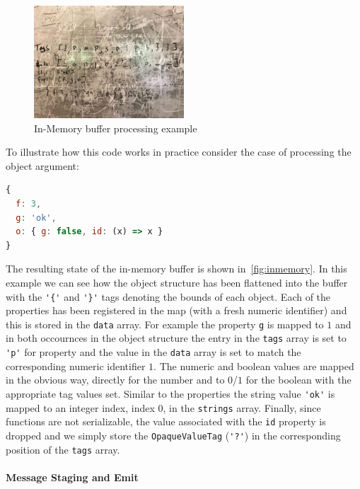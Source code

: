 \begin{figure}
    \centering
    \includegraphics[width=0.5\textwidth]{Figures/InMemoryExample}
    \caption{In-Memory buffer processing example}
    \label{fig:inmemory}
\end{figure}

To illustrate how this code works in practice consider the case of processing the 
object argument:

\begin{lstlisting}[language=JavaScript,basicstyle=\scriptsize,numbers=none]
{
  f: 3,
  g: 'ok',
  o: { g: false, id: (x) => x }
}
\end{lstlisting}

The resulting state of the in-memory buffer is shown in~\autoref{fig:inmemory}. 
In this example we can see how the object structure has been flattened into 
the buffer with the \lstinline!'{'! and \lstinline!'}'! tags denoting the bounds 
of each object. Each of the properties has been registered in the map (with a fresh 
numeric identifier) and this is stored in the \texttt{data} array. For example the 
property \lstinline!g! is mapped to $1$ and in both occournces in the object 
structure the entry in the \texttt{tags} array is set to \lstinline!'p'! for 
property and the value in the \texttt{data} array is set to match the corresponding 
numeric identifier $1$. The numeric and boolean values are mapped in the obvious 
way, directly for the number and to $0$/$1$ for the boolean with the appropriate 
tag values set. Similar to the properties the string value \lstinline!'ok'! is 
mapped to an integer index, index $0$, in the \texttt{strings} array. Finally, 
since functions are not serializable, the value associated with the \lstinline!id! 
property is dropped and we simply store the \texttt{OpaqueValueTag} (\lstinline!'?'!) 
in the corresponding position of the \texttt{tags} array.

\paragraph{Message Staging and Emit}
\noindent


